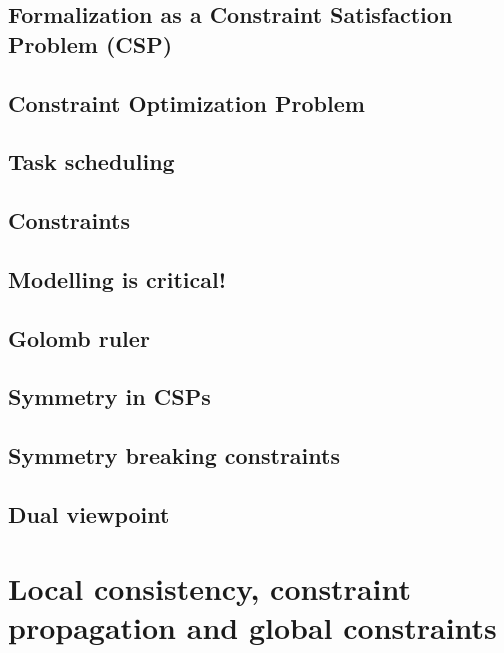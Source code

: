 \documentclass[12pt,a4paper,twoside]{book}
\begin{document}
\section{Formalization as a Constraint Satisfaction Problem (CSP)}

\label{s_2_1}

\section{Constraint Optimization Problem}

\label{s_2_2}

\section{Task scheduling}

\label{s_2_3}

\section{Constraints}

\label{s_2_4}

\section{Modelling is critical!}

\label{s_2_5}

\section{Golomb ruler}

\label{s_2_6}

\section{Symmetry in CSPs}

\label{s_2_7}

\section{Symmetry breaking constraints}

\label{s_2_8}

\section{Dual viewpoint}

\label{s_2_9}

\chapter{Local consistency, constraint propagation and global constraints}

\label{c_3}
\end{document}

